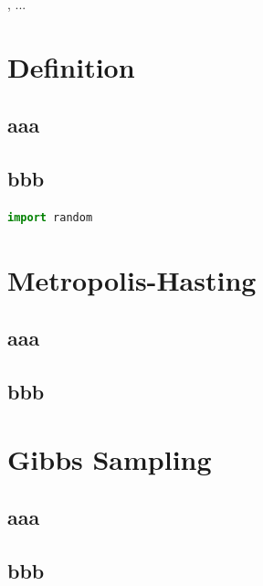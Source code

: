 \documentclass[10pt,journal]{IEEEtran}
\begin{document}
% 
% 
% 
% 
, ...

\section{Definition}
\subsection{aaa}

\subsection{bbb}

\scriptsize
\begin{lstlisting}[language=python, frame=shadowbox]
import random

\end{lstlisting}
\normalsize

\section{Metropolis-Hasting}
\subsection{aaa}

\subsection{bbb}

\section{Gibbs Sampling}
\subsection{aaa}

\subsection{bbb}
\end{document}
